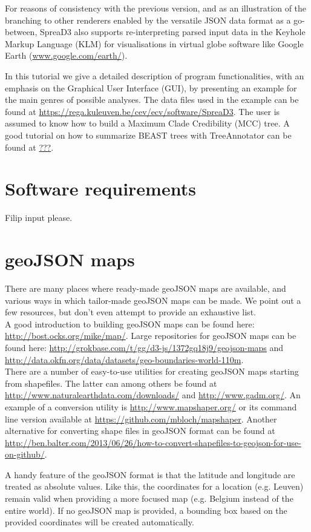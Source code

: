 \documentclass[english]{paper}
\begin{document}
For reasons of consistency with the previous version, and as an illustration of the branching to other renderers enabled by the versatile JSON data format as a go-between, SpreaD3 also supports re-interpreting parsed input data in the Keyhole Markup Language (KLM) for visualisations in virtual globe software like Google Earth (\url{www.google.com/earth/}). 
\par
In this tutorial we give a detailed description of program functionalities, with an emphasis on the Graphical User Interface (GUI), by presenting an example for the main genres of possible analyses. %
The data files used in the example can be found at  \url{https://rega.kuleuven.be/cev/ecv/software/SpreaD3}.
The user is assumed to know how to build a Maximum Clade Credibility (MCC) tree. 
A good tutorial on how to summarize BEAST trees with TreeAnnotator can be found at \url{???}.

\section{Software requirements}

Filip input please.

\section{geoJSON maps}	

There are many places where ready-made geoJSON maps are available, and various ways in which tailor-made geoJSON maps can be made. 
We point out a few resources, but don't even attempt to provide an exhaustive list.
\\
A good introduction to building geoJSON maps can be found here: \url{http://bost.ocks.org/mike/map/}.
Large repositories for geoJSON maps can be found here:
\url{http://grokbase.com/t/gg/d3-js/1372gq18j9/geojson-maps} and \url{http://data.okfn.org/data/datasets/geo-boundaries-world-110m}.
\\
There are a number of easy-to-use utilities for creating geoJSON maps starting from shapefiles. 
The latter can among others be found at \url{http://www.naturalearthdata.com/downloads/} and \url{http://www.gadm.org/}.
An example of a conversion utility is \url{http://www.mapshaper.org/} or its command line version available at \url{https://github.com/mbloch/mapshaper}.
Another alternative for converting shape files in geoJSON format can be found at \url{http://ben.balter.com/2013/06/26/how-to-convert-shapefiles-to-geojson-for-use-on-github/}.
\par
A handy feature of the geoJSON format is that the latitude and longitude are treated as absolute values.
Like this, the coordinates for a location (e.g. Leuven) remain valid when providing a more focused map (e.g. Belgium instead of the entire world).
If no geoJSON map is provided, a bounding box based on the provided coordinates will be created automatically.
\end{document}
